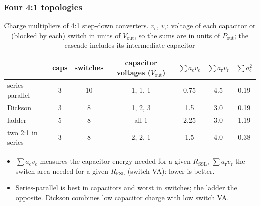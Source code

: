 \begin{frame}
	\frametitle{Four 4:1 topologies}
	\begin{table}
		\centering
		\footnotesize
		\begin{tabular}{|l|c|c|c|c|c|c|}
			\hline
			                  & caps & switches & capacitor voltages ($V_\mathrm{out}$) & $\sum a_\mathrm{c}v_\mathrm{c}$ & $\sum a_\mathrm{r}v_\mathrm{r}$ & $\sum a_\mathrm{c}^2$ \\
			\hline
			series-parallel   & 3    & 10       & 1, 1, 1                               & 0.75                            & 4.5                             & 0.19                  \\
			Dickson           & 3    & 8        & 1, 2, 3                               & 1.5                             & 3.0                             & 0.19                  \\
			ladder            & 5    & 8        & all 1                                 & 2.25                            & 3.0                             & 1.19                  \\
			two 2:1 in series & 3    & 8        & 2, 2, 1                               & 1.5                             & 4.0                             & 0.38                  \\
			\hline
		\end{tabular}
		\caption{Charge multipliers of 4:1 step-down converters. $v_\mathrm{c}$, $v_\mathrm{r}$: voltage of each capacitor or (blocked by each) switch in units of $V_\mathrm{out}$, so the sums are in units of $P_\mathrm{out}$; the cascade includes its intermediate capacitor}
	\end{table}
	\small
	\begin{itemize}
		\item $\sum a_\mathrm{c}v_\mathrm{c}$ measures the capacitor energy needed for a given $R_\mathrm{SSL}$, $\sum a_\mathrm{r}v_\mathrm{r}$ the switch area needed for a given $R_\mathrm{FSL}$ (switch VA): lower is better.
		\item Series-parallel is best in capacitors and worst in switches; the ladder the opposite. Dickson combines low capacitor charge with low switch VA.
	\end{itemize}
\end{frame}


